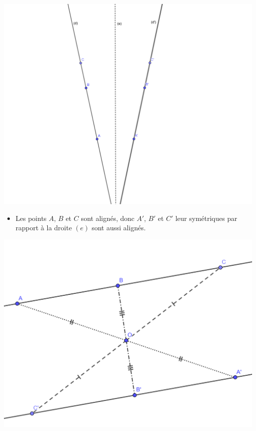 \documentclass[12pt,a4paper]{article}
\begin{document}


\begin{myexs}
	\begin{multicols}{2}
		\begin{center}
			\includegraphics[scale=0.1]{sym_droites1}
		\end{center}
		
		\begin{itemize}
			\item Les points $A$, $B$ et $C$ sont alignés, donc $A'$, $B'$ et $C'$ leur symétriques par rapport à la droite $(e)$ sont aussi alignés.
		\end{itemize}	
		
		\begin{center}
			\includegraphics[scale=0.2]{sym_droites2}
		\end{center}
		

\end{multicols}
\end{myexs}
\end{document}
